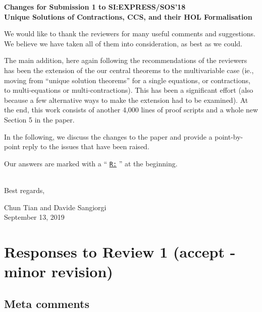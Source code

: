 \newcommand{\Mark}{{\underline{\tt R:} }}


\begin{center}
\textbf{
{\small Changes for Submission 1 to SI:EXPRESS/SOS'18}\\[5mm]
{\large Unique Solutions of Contractions, CCS, and their HOL
  Formalisation
}}
\end{center}



\vskip 10pt
\noindent

We would like to thank the reviewers for many useful
comments and suggestions. We believe we have taken all of them into consideration, as best
as we could. 

The main addition, here again following the recommendations of the reviewers 
has been the extension of the our central theorems 
to the multivariable case (ie., moving from ``unique solution theorems'' for a single
equations, or contractions,  to multi-equations  or multi-contractions). 
 This has been a significant effort (also because a few alternative ways to make the
 extension had to be examined). At the end, this work 
consists of another 4,000 lines of proof scripts and a whole new
Section 5 in the paper.


In the following, we discuss the changes to the paper and provide a
point-by-point reply to the issues that have been raised.

Our answers are marked  with a `` \Mark''  at the beginning.

\ \\

Best regards,
\begin{flushright}
  Chun Tian and Davide Sangiorgi \\
  September 13, 2019
\end{flushright}

\vspace{1cm}

\section*{Responses to Review 1 (accept - minor revision)}

\subsection*{Meta comments}

